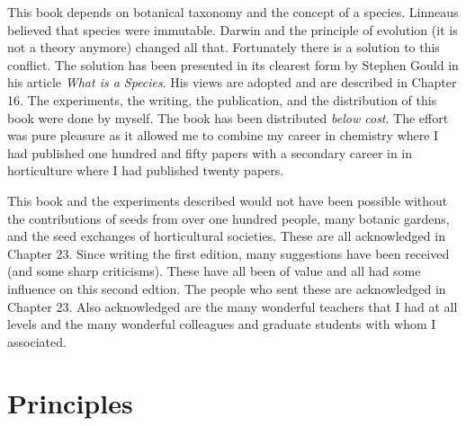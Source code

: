 This book depends on botanical taxonomy and the concept of a species.  Linneaus
believed that species were immutable. Darwin and the principle of evolution (it
is not a theory anymore) changed all that. Fortunately there is a solution to
this conflict. The solution has been presented in its clearest form by Stephen
Gould in his article \textit{What is a Species}. His views are adopted and are described
in Chapter 16.  The experiments, the writing, the publication, and the
distribution of this book were done by myself. The book has been distributed
\textit{below cost}. The effort was pure pleasure as it allowed me to combine my career
in chemistry where I had published one hundred and fifty papers with a
secondary career in in horticulture where I had published twenty papers.

This book and the experiments described would not have been possible without
the contributions of seeds from over one hundred people, many botanic gardens, and
the seed exchanges of horticultural societies. These are all acknowledged in Chapter
23. Since writing the first edition, many suggestions have been received (and some
sharp criticisms). These have all been of value and all had some influence on this
second edtion. The people who sent these are acknowledged in Chapter 23. Also
acknowledged are the many wonderful teachers that I had at all levels and the many
wonderful colleagues and graduate students with whom I associated.

\section{Principles}


